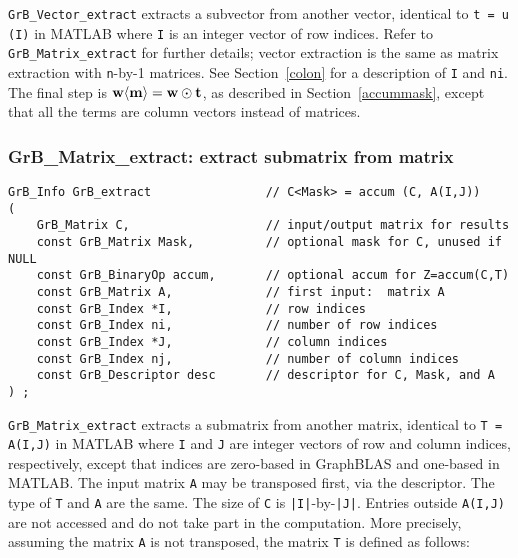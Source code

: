 \documentclass[12pt]{article}
\begin{document}
\verb'GrB_Vector_extract' extracts a subvector from another vector, identical
to \verb't = u (I)' in MATLAB where \verb'I' is an integer vector of row
indices.  Refer to \verb'GrB_Matrix_extract' for further details; vector
extraction is the same as matrix extraction with \verb'n'-by-1 matrices.
See Section~\ref{colon} for a description of \verb'I' and \verb'ni'.
The final step is ${\bf w \langle m \rangle  = w \odot
t}$, as described in Section~\ref{accummask}, except that all the terms are
column vectors instead of matrices.

\newpage
\subsubsection{{\sf GrB\_Matrix\_extract:} extract submatrix from matrix}
\label{extract_matrix}

\begin{mdframed}[userdefinedwidth=6in]
{\footnotesize
\begin{verbatim}
GrB_Info GrB_extract                // C<Mask> = accum (C, A(I,J))
(
    GrB_Matrix C,                   // input/output matrix for results
    const GrB_Matrix Mask,          // optional mask for C, unused if NULL
    const GrB_BinaryOp accum,       // optional accum for Z=accum(C,T)
    const GrB_Matrix A,             // first input:  matrix A
    const GrB_Index *I,             // row indices
    const GrB_Index ni,             // number of row indices
    const GrB_Index *J,             // column indices
    const GrB_Index nj,             // number of column indices
    const GrB_Descriptor desc       // descriptor for C, Mask, and A
) ;
\end{verbatim} } \end{mdframed}

\verb'GrB_Matrix_extract' extracts a submatrix from another matrix, identical
to \verb'T = A(I,J)' in MATLAB where \verb'I' and \verb'J' are integer vectors
of row and column indices, respectively, except that indices are zero-based in
GraphBLAS and one-based in MATLAB.  The input matrix \verb'A' may be transposed
first, via the descriptor.  The type of \verb'T' and \verb'A' are the same.
The size of \verb'C' is \verb'|I|'-by-\verb'|J|'.
Entries outside \verb'A(I,J)' are not accessed and do not take part in the
computation.  More precisely, assuming the matrix \verb'A' is not transposed,
the matrix \verb'T' is defined as follows:
\end{document}
